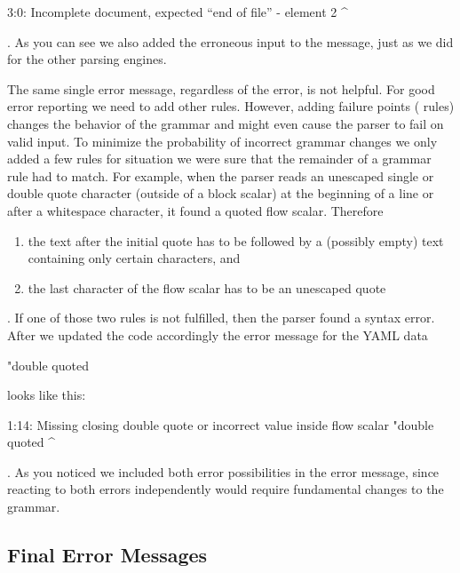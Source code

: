 \begin{textcode}
  3:0: Incomplete document, expected “end of file”
       - element 2
       ^
\end{textcode}

. As you can see we also added the erroneous input to the message, just as we did for the other parsing engines.

The same single error message, regardless of the error, is not helpful. For good error reporting we need to add other  rules. However, adding failure points ( rules) changes the behavior of the grammar and might even cause the parser to fail on valid input. To minimize the probability of incorrect grammar changes we only added a few rules for situation we were sure that the remainder of a grammar rule had to match. For example, when the parser reads an unescaped single or double quote character (outside of a block scalar) at the beginning of a line or after a whitespace character, it found a quoted flow scalar. Therefore

\begin{enumerate}
  \item the text after the initial quote has to be followed by a (possibly empty) text containing only certain characters, and
  \item the last character of the flow scalar has to be an unescaped quote
\end{enumerate}

. If one of those two rules is not fulfilled, then the parser found a syntax error. After we updated the code accordingly the error message for the YAML data

\begin{yamlcode}
  "double quoted
\end{yamlcode}

looks like this:

\begin{textcode}
  1:14: Missing closing double quote or
        incorrect value inside flow scalar
        "double quoted
                      ^
\end{textcode}

. As you noticed we included both error possibilities in the error message, since reacting to both errors independently would require fundamental changes to the grammar.

\subsection{Final Error Messages}


